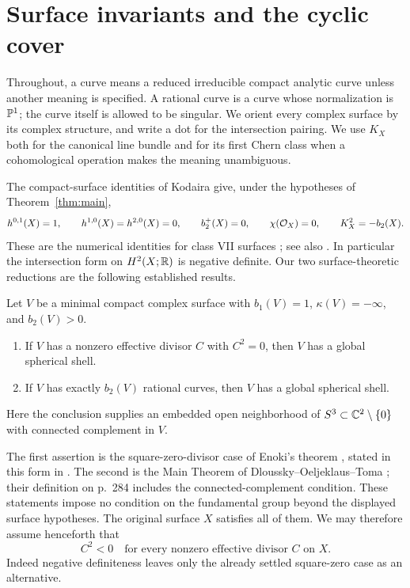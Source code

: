 \section{Surface invariants and the cyclic cover}
\label{sec:surfaces}

Throughout, a curve means a reduced irreducible compact analytic curve unless
another meaning is specified. A rational curve is a curve whose normalization
is $\mathbb P^1$; the curve itself is allowed to be singular. We orient every complex
surface by its complex structure, and write a dot for the intersection pairing.
We use $K_X$ both for the canonical line bundle and for its first Chern class
when a cohomological operation makes the meaning unambiguous.

The compact-surface identities of Kodaira give, under the hypotheses of
Theorem~\ref{thm:main},
\begin{equation}\label{surface:invariants}
 h^{0,1}(X)=1,\qquad h^{1,0}(X)=h^{2,0}(X)=0,\qquad
 b_2^+(X)=0,\qquad \chi(\mathcal O_X)=0,
 \qquad K_X^2=-b_2(X).
\end{equation}
These are the numerical identities for class VII surfaces
\cite[Theorem~3]{Kodaira1964}; see also \cite{BHPV2004}.
In particular the intersection form on $H^2(X;\mathbb R)$ is negative definite.
Our two surface-theoretic reductions are the following established results.

\begin{proposition}\label{surface:reduction}
Let $V$ be a minimal compact complex surface with $b_1(V)=1$,
$\kappa(V)=-\infty$, and $b_2(V)>0$.
\begin{enumerate}[label=\textup{(\roman*)}]
\item If $V$ has a nonzero effective divisor $C$ with $C^2=0$, then $V$
has a global spherical shell.
\item If $V$ has exactly $b_2(V)$ rational curves, then $V$ has a global
spherical shell.
\end{enumerate}
Here the conclusion supplies an embedded open neighborhood of
$S^3\subset\mathbb C^2\setminus\{0\}$ with connected complement in $V$.
\end{proposition}

The first assertion is the square-zero-divisor case of Enoki's theorem
\cite{Enoki1981}, stated in this form in \cite[p.~1758]{Teleman2010}.
The second is the Main Theorem of Dloussky--Oeljeklaus--Toma
\cite[p.~283]{DOT2003}; their definition on p.~284 includes the
connected-complement condition. These statements impose no condition on the
fundamental group beyond the displayed surface hypotheses. The original
surface $X$ satisfies all of them. We may therefore assume henceforth that
\begin{equation}\label{surface:no-square-zero}
 C^2<0\quad\text{for every nonzero effective divisor }C\text{ on }X.
\end{equation}
Indeed negative definiteness leaves only the already settled square-zero
case as an alternative.


